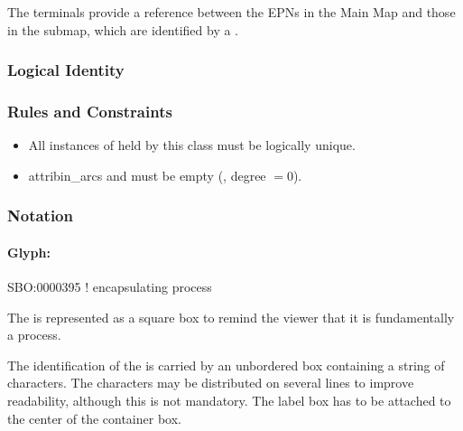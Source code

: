 \begin{attributes}
 The terminals provide a
reference between the EPNs in the Main Map and those in the submap,
which are identified by a .
\end{attributes}

\subsubsection{Logical Identity}

\begin{logicalkey}
  \item {}
  \item {}
\end{logicalkey}

\subsubsection{Rules and Constraints}

\begin{itemize}
\item All instances of  held by this class
  must be logically unique.
\item attrib{in\_arcs} and  must be empty (\ie,
  degree $=0$).
\end{itemize}

\subsubsection{Notation}

\paragraph{Glyph: }

\begin{glyphDescription}

\glyphSboTerm SBO:0000395 ! encapsulating process

\glyphContainer The  is represented as a square box to remind the viewer that it is fundamentally a process.

\glyphLabel The identification of the  is carried by an unbordered box containing a string of characters.  The characters may be distributed on several lines to improve readability, although this is not mandatory.  The label box has to be attached to the center of the container box.

\end{glyphDescription}


